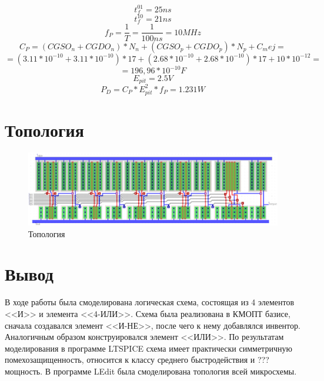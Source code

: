\documentclass[a4paper,14pt]{article}
\begin{document}
$$t_{f}^{01} = 25ns$$
$$t_{f}^{10} = 21ns$$
$$f_{P} = \dfrac{1}{T} = \dfrac{1}{100ns} = 10 MHz$$
$$C_P = (CGSO_n + CGDO_n)*N_n + (CGSO_p + CGDO_p)*N_p + C_mej =$$ $$= (3.11 * 10^{-10} + 3.11 * 10^{-10}) * 17 + (2.68  * 10^{-10} + 2.68  * 10^{-10}) * 17  + 10 * 10^{-12}=$$
$$ =196,96*10 ^{-10}F$$
$$E_{pit} = 2.5V$$
$$P_D = C_P * E_{pit}^2 * f_P = 1.231W$$




\section{Топология}

\begin{landscape}
\begin{figure}[H]
	\centering		
	\includegraphics[width=\linewidth]{image/ledit_schema}
	\caption{Топология}\label{img:ledit_schema}
\end{figure}
\end{landscape}

\section{Вывод}

В ходе работы была смоделирована логическая схема, состоящая из 4 элементов <<И>> и элемента <<4-ИЛИ>>.
Схема была реализована в КМОПТ базисе, сначала создавался элемент <<И-НЕ>>, после чего к нему добавлялся инвентор.
Аналогичным образом конструировался элемент <<ИЛИ>>.
По результатам моделирования в программе LTSPICE схема имеет практически симметричную помехозащищенность, относится к классу среднего быстродействия и ??? мощность.
В программе LEdit была смоделирована топология всей микросхемы.
\end{document}
